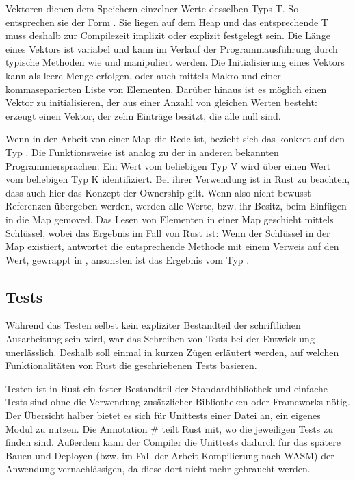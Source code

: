 Vektoren dienen dem Speichern einzelner Werte desselben Typs T. So entsprechen sie der Form . Sie liegen auf dem Heap und das entsprechende T muss deshalb zur Compilezeit implizit oder explizit festgelegt sein. Die Länge eines Vektors ist variabel und kann im Verlauf der Programmausführung durch typische Methoden wie  und  manipuliert werden. Die Initialisierung eines Vektors kann als leere Menge erfolgen, oder auch mittels Makro  und einer kommaseparierten Liste von Elementen. Darüber hinaus ist es möglich einen Vektor zu initialisieren, der aus einer Anzahl von gleichen Werten besteht:  erzeugt einen Vektor, der zehn Einträge besitzt, die alle null sind.

Wenn in der Arbeit von einer Map die Rede ist, bezieht sich das konkret auf den Typ . Die Funktionsweise ist analog zu der in anderen bekannten Programmiersprachen: Ein Wert vom beliebigen Typ V wird über einen Wert vom beliebigen Typ K identifiziert. Bei ihrer Verwendung ist in Rust zu beachten, dass auch hier das Konzept der Ownership gilt. Wenn also nicht bewusst Referenzen übergeben werden, werden alle Werte, bzw. ihr Besitz, beim Einfügen in die Map gemoved. Das Lesen von Elementen in einer Map geschieht mittels Schlüssel, wobei das Ergebnis im Fall von Rust  ist: Wenn der Schlüssel in der Map existiert, antwortet die entsprechende Methode mit einem Verweis auf den Wert, gewrappt in , ansonsten ist das Ergebnis vom Typ .

\subsection{Tests}

Während das Testen selbst kein expliziter Bestandteil der schriftlichen Ausarbeitung sein wird, war das Schreiben von Tests bei der Entwicklung unerlässlich. Deshalb soll einmal in kurzen Zügen erläutert werden, auf welchen Funktionalitäten von Rust die geschriebenen Tests basieren.

Testen ist in Rust ein fester Bestandteil der Standardbibliothek und einfache Tests sind ohne die Verwendung zusätzlicher Bibliotheken oder Frameworks nötig. Der Übersicht halber bietet es sich für Unittests einer Datei an, ein eigenes Modul zu nutzen. Die Annotation \# teilt Rust mit, wo die jeweiligen Tests zu finden sind. Außerdem kann der Compiler die Unittests dadurch für das spätere Bauen und Deployen (bzw. im Fall der Arbeit Kompilierung nach \ac{WASM}) der Anwendung vernachlässigen, da diese dort nicht mehr gebraucht werden.

